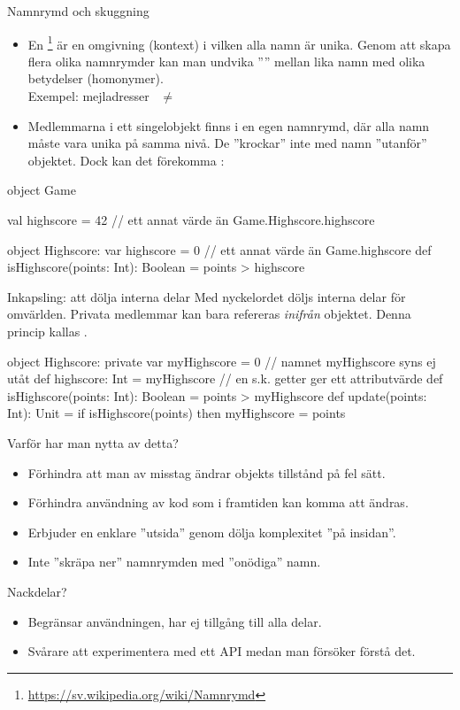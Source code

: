 \begin{Slide}{Namnrymd och skuggning}
\begin{itemize}\SlideFontSmall
  \item En \footnote{\url{https://sv.wikipedia.org/wiki/Namnrymd}}   är en omgivning (kontext) i vilken alla namn är unika. Genom att skapa flera olika namnrymder
  kan man undvika '''' mellan lika namn med olika betydelser (homonymer). \\
  Exempel: mejladresser   ~$\neq$~  
  \item Medlemmarna i ett singelobjekt finns i en egen namnrymd,
  där alla namn måste vara unika på samma nivå. De ''krockar'' inte med namn ''utanför'' objektet. Dock kan det förekomma  :
\end{itemize}
\begin{Code}
object Game {

  val highscore = 42   // ett annat värde än Game.Highscore.highscore

  object Highscore:
    var highscore = 0  // ett annat värde än Game.highscore
    def isHighscore(points: Int): Boolean = points > highscore
}
\end{Code}

\end{Slide}



\begin{Slide}{Inkapsling: att dölja interna delar}\SlideFontSmall
Med nyckelordet  döljs interna delar för omvärlden.
Privata medlemmar kan bara refereras \emph{inifrån} objektet.
Denna princip kallas  .
\begin{CodeSmall}
object Highscore:
  private var myHighscore = 0        // namnet myHighscore syns ej utåt
  def highscore: Int = myHighscore   // en s.k. getter ger ett attributvärde
  def isHighscore(points: Int): Boolean = points > myHighscore
  def update(points: Int): Unit = if isHighscore(points) then myHighscore = points
\end{CodeSmall}
Varför har man nytta av detta?
\pause

\begin{itemize}
  \item Förhindra att man av misstag ändrar objekts tillstånd på fel sätt.
  \item Förhindra användning av kod som i framtiden kan komma att ändras.
  \item Erbjuder en enklare ''utsida'' genom dölja komplexitet ''på insidan''.
  \item Inte ''skräpa ner'' namnrymden med ''onödiga'' namn.
\end{itemize}
Nackdelar?
\pause
\begin{itemize}
  \item Begränsar användningen, har ej tillgång till alla delar.
  \item Svårare att experimentera med ett API medan man försöker förstå det.
\end{itemize}
\end{Slide}



